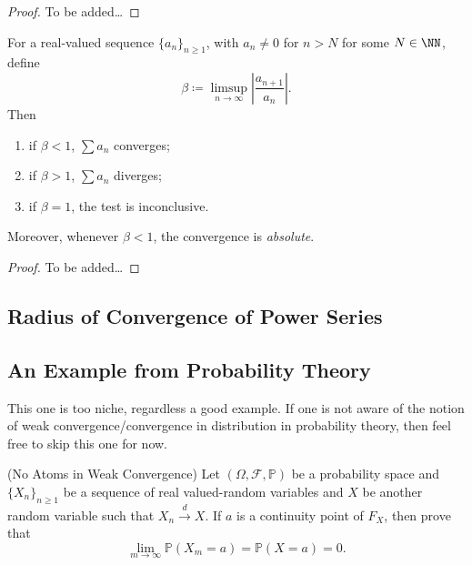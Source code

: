 \documentclass[parskip=half, numbers=endperiod, 11pt]{scrartcl}
\begin{document}
\begin{proof}
	To be added\dots
\end{proof}

\begin{theorem}
	For a real-valued sequence $\{a_n\}_{n \ge 1}$,
	with $a_n \ne 0$ for $n > N$ for some $N \in \NN$,
	define
	\[\beta \coloneqq \limsup_{n \to \infty} \left| \frac{a_{n+1}}{a_n}\right|.\]
	Then
	\begin{enumerate}
		\item if $\beta < 1$, $\sum a_n$ converges;
		\item if $\beta > 1$, $\sum a_n$ diverges;
		\item if $\beta = 1$, the test is inconclusive.
	\end{enumerate}
	Moreover, whenever $\beta < 1$, the convergence
	is \emph{absolute}.
\end{theorem}

\begin{proof}
	To be added\dots
\end{proof}


\subsection{Radius of Convergence of Power Series}

\subsection{An Example from Probability Theory}
This one is too niche, regardless a good example.
If one is not aware of the notion of
weak convergence/convergence in distribution in
probability theory, then feel free to skip this one
for now.

\begin{prob*}{(No Atoms in Weak Convergence)}{}
	Let $(\Omega, \mathcal F, \mathbb P)$ be a
	probability space and $\{X_n\}_{n \ge 1}$ be a sequence
	of real valued-random variables and $X$ be another
	random variable such that $X_n \overset{d}{\to} X$.
	If $a$ is a continuity point of $F_X$, then prove that
	\[\lim_{m \to \infty} \mathbb{P}(X_m = a) = \mathbb{P}(X = a) = 0.  \]
\end{prob*}
\end{document}
